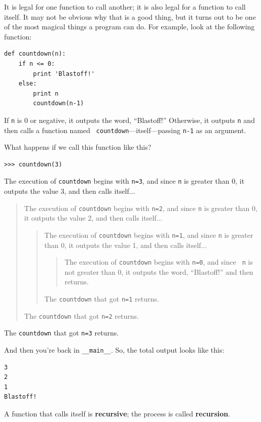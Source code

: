 \documentclass[10pt]{book}
\begin{document}
It is legal for one function to call another;
it is also legal for a function to call itself.  It may not be obvious
why that is a good thing, but it turns out to be one of the most
magical things a program can do.
For example, look at the following function:

\begin{verbatim}
def countdown(n):
    if n <= 0:
        print 'Blastoff!'
    else:
        print n
        countdown(n-1)
\end{verbatim}
%
If {\tt n} is 0 or negative, it outputs the word, ``Blastoff!''
Otherwise, it outputs {\tt n} and then calls a function named {\tt
countdown}---itself---passing {\tt n-1} as an argument.

What happens if we call this function like this?

\begin{verbatim}
>>> countdown(3)
\end{verbatim}
%
The execution of {\tt countdown} begins with {\tt n=3}, and since
{\tt n} is greater than 0, it outputs the value 3, and then calls itself...

\begin{quote}
The execution of {\tt countdown} begins with {\tt n=2}, and since
{\tt n} is greater than 0, it outputs the value 2, and then calls itself...

\begin{quote}
The execution of {\tt countdown} begins with {\tt n=1}, and since
{\tt n} is greater than 0, it outputs the value 1, and then calls itself...

\begin{quote}
The execution of {\tt countdown} begins with {\tt n=0}, and since {\tt
n} is not greater than 0, it outputs the word, ``Blastoff!'' and then
returns.
\end{quote}

The {\tt countdown} that got {\tt n=1} returns.
\end{quote}

The {\tt countdown} that got {\tt n=2} returns.
\end{quote}

The {\tt countdown} that got {\tt n=3} returns.

And then you're back in \verb"__main__".  So, the
total output looks like this:

\begin{verbatim}
3
2
1
Blastoff!
\end{verbatim}
%
A function that calls itself is {\bf recursive}; the process is
called {\bf recursion}.
\end{document}
